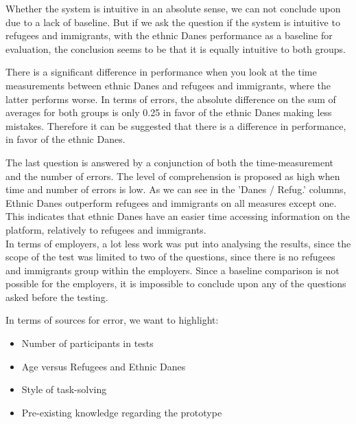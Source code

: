 Whether the system is intuitive in an absolute sense, we can not conclude upon due to a lack of baseline. But if we ask the question if the system is intuitive to refugees and immigrants, with the ethnic Danes performance as a baseline for evaluation, the conclusion seems to be that it is equally intuitive to both groups. 

There is a significant difference in performance when you look at the time measurements between ethnic Danes and refugees and immigrants, where the latter performs worse. In terms of errors, the absolute difference on the sum of averages for both groups is only 0.25 in favor of the ethnic Danes making less mistakes. Therefore it can be suggested that there is a difference in performance, in favor of the ethnic Danes. 

The last question is answered by a conjunction of both the time-measurement and the number of errors. The level of comprehension is proposed as high when time and number of errors is low. As we can see in the 'Danes / Refug.' columns, Ethnic Danes outperform refugees and immigrants on all measures except one. This indicates that ethnic Danes have an easier time accessing information on the platform, relatively to refugees and immigrants. 
\\

In terms of employers, a lot less work was put into analysing the results, since the scope of the test was limited to two of the questions, since there is no refugees and immigrants group within the employers. Since a baseline comparison is not possible for the employers, it is impossible to conclude upon any of the questions asked before the testing. 

In terms of sources for error, we want to highlight:

\newpage

\begin{itemize}
    \item Number of participants in tests
    \item Age versus Refugees and Ethnic Danes
    \item Style of task-solving
    \item Pre-existing knowledge regarding the prototype
\end{itemize}

